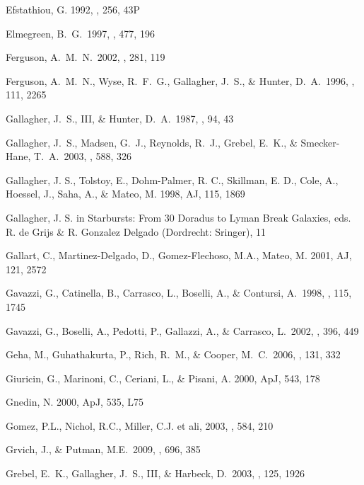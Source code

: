 \documentclass[12pt,preprint]{emulateapj}
\begin{document}
\begin{thebibliography}{}
Efstathiou, G. 1992, \mnras, 256, 43P 

Elmegreen, B.~G.\ 1997, \apj, 477, 196 

Ferguson, A.~M.~N.\ 2002, \apss, 281, 119 

Ferguson, A.~M.~N., Wyse, R.~F.~G., Gallagher, J.~S., \& Hunter, D.~A.\ 
1996, \aj, 111, 2265 

Gallagher, J.~S., III, \& Hunter, D.~A.\ 1987, \aj, 94, 43 

Gallagher, J.~S., Madsen, G.~J., Reynolds, R.~J., Grebel, E.~K., \& 
    Smecker-Hane, T.~A.\ 2003, \apj, 588, 326 

Gallagher, J. S., Tolstoy, E., Dohm-Palmer, R. C., Skillman, E. D., Cole, A., 
Hoessel, J., Saha, A., \& Mateo, M. 1998, AJ, 115, 1869

Gallagher, J. S. in Starbursts: From 30 Doradus to Lyman Break Galaxies,
eds. R. de Grijs \& R. Gonzalez Delgado (Dordrecht: Sringer), 11

Gallart, C., Martinez-Delgado, D., Gomez-Flechoso, M.A., Mateo, M. 2001, AJ, 121, 2572

Gavazzi, G., Catinella, B., Carrasco, L., Boselli, A., \& Contursi, A.\ 
1998, \aj, 115, 1745 

Gavazzi, G., Boselli, A., Pedotti, P., Gallazzi, A., \& Carrasco, L.\ 
2002, \aap, 396, 449 

\bibitem[Geha et al.(2006)]{ggrc06} 
Geha, M., Guhathakurta, P., Rich, R.~M., \& Cooper, M.~C.\ 2006, \aj, 131, 332 

Giuricin, G., Marinoni, C., Ceriani, L., \& Pisani, A. 2000, ApJ, 543, 178

\bibitem[Gnedin (2000)]{g00}
Gnedin, N. 2000, ApJ, 535, L75

Gomez, P.L., Nichol, R.C., Miller, C.J. et ali, 2003, \apj, 584, 210

Grvich, J., \& Putman, M.E.\ 2009, \apj, 696, 385

\bibitem[Grebel et al.(2003)]{ggh03} 
Grebel, E.~K., Gallagher, J.~S., III, \& Harbeck, D.\ 2003, \aj, 125, 1926


\end{thebibliography}
\end{document}
